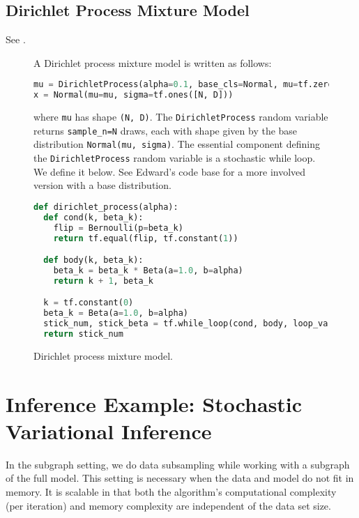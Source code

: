 \subsection{Dirichlet Process Mixture Model}
\label{appendix:dirichlet_process}

See .

\begin{figure}[!h]
A Dirichlet process mixture model is written as follows:
\begin{lstlisting}[language=python]
mu = DirichletProcess(alpha=0.1, base_cls=Normal, mu=tf.zeros(D), sigma=tf.ones(D), sample_n=N)
x = Normal(mu=mu, sigma=tf.ones([N, D]))
\end{lstlisting}
where \texttt{mu} has shape \texttt{(N, D)}. The
\texttt{DirichletProcess} random variable returns \texttt{sample_n=N}
draws, each with shape given by the base distribution
\texttt{Normal(mu, sigma)}.
The essential component defining the \texttt{DirichletProcess} random
variable is a stochastic while loop. We define it below. See Edward's code
base for a more involved version with a base distribution.
\begin{lstlisting}[language=python]
def dirichlet_process(alpha):
  def cond(k, beta_k):
    flip = Bernoulli(p=beta_k)
    return tf.equal(flip, tf.constant(1))

  def body(k, beta_k):
    beta_k = beta_k * Beta(a=1.0, b=alpha)
    return k + 1, beta_k

  k = tf.constant(0)
  beta_k = Beta(a=1.0, b=alpha)
  stick_num, stick_beta = tf.while_loop(cond, body, loop_vars=[k, beta_k])
  return stick_num
\end{lstlisting}
\caption{Dirichlet process mixture model.}
\label{fig:dp}
\end{figure}

\section{Inference Example: Stochastic Variational Inference}
\label{appendix:svi}

In the subgraph setting, we do data subsampling while working with a
subgraph of the full model. This setting is necessary when the data
and model do not fit in memory.
It is scalable in that both the
algorithm's computational complexity (per iteration) and memory
complexity are independent of the data set size.

